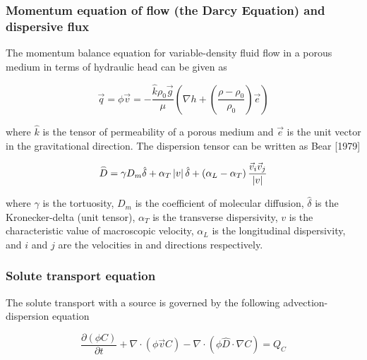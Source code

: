 \subsubsection[Momentum Equation of Flow and Dispersive Flux]{Momentum equation of flow (the Darcy Equation) and dispersive flux}\label{SS:MomentumAndDispersion}

The momentum balance equation for variable-density fluid flow in a
porous medium in terms of hydraulic head can be given as

\begin{equation}\label{DarcyEquation}
\vec q = \phi \vec v =  - \frac{{\hat k\rho _0 \vec g}}{\mu }\left(
{\nabla h + \left( {\frac{{\rho  - \rho _0 }}{{\rho _0 }}}
\right)\vec e} \right)
\end{equation}

where $\hat k$ is the tensor of permeability of a porous medium and
$\vec e$ is the unit vector in the gravitational direction. The
dispersion tensor can be written as Bear [1979]

\begin{equation}\label{DispersiveFlux}
\mathord{\buildrel{\lower3pt\hbox{$\scriptscriptstyle\frown$}} \over
D}  = \gamma D_m \hat \delta  + \alpha _T \left| v \right|\hat
\delta  + \left( {\alpha _L  - \alpha _T } \right)\frac{{\vec v_i
\vec v_j }}{{\left| v \right|}}
\end{equation}

where $\gamma$ is the tortuosity, $D_m$ is the coefficient of
molecular diffusion, $\hat \delta$ is the Kronecker-delta (unit
tensor), $\alpha _T$ is the transverse dispersivity, $v$ is the
characteristic value of macroscopic velocity, $\alpha _L$ is the
longitudinal dispersivity, and $i$ and $j$ are the velocities in and
directions respectively.

\subsubsection{Solute transport equation}\label{SS:ContaminantTransport}

The solute transport with a source is governed by the following
advection-dispersion equation

\begin{equation}\label{ContaminantTransportEquation}
\frac{{\partial \left( {\phi C} \right)}}{{\partial t}} + \nabla
\cdot \left( {\phi \vec vC} \right) - \nabla  \cdot \left( {\phi
\hat D \cdot \nabla C} \right) = Q_C
\end{equation}

